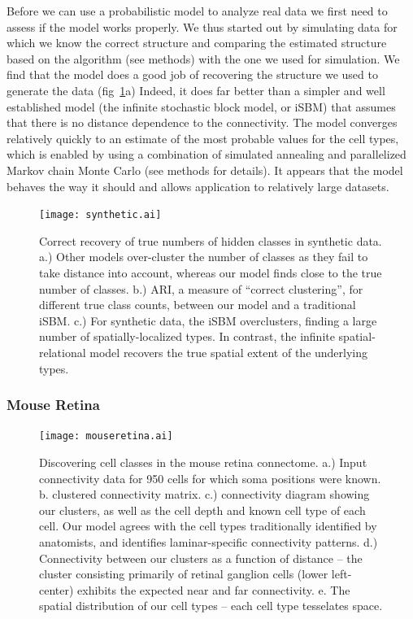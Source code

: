 \documentclass{article}
\begin{document}
Before we can use a probabilistic model to analyze real data we first
need to assess if the model works properly. We thus started out by
simulating data for which we know the correct structure and comparing
the estimated structure based on the algorithm (see methods) with the
one we used for simulation. We find that the model does a good job of
recovering the structure we used to generate the data
(fig~\ref{fig:synthetic}a) Indeed, it does far better than a simpler
and well established model (the infinite stochastic block model, or
iSBM) that assumes that there is no distance dependence to the
connectivity. The model converges relatively quickly to an estimate of
the most probable values for the cell types, which is enabled by using
a combination of simulated annealing and parallelized Markov chain
Monte Carlo (see methods for details). It appears that the model
behaves the way it should and allows application to relatively large
datasets.

\begin{figure}
  \centering 
  \centerline{\texttt{[image: synthetic.ai]}}
  \caption{Correct recovery of true numbers of hidden classes
in synthetic data. a.) Other models over-cluster the number
of classes as they fail to take distance into account, whereas
our model finds close to the true number of classes. b.) ARI, a measure
of ``correct clustering'', for
different true class counts, between our model and a traditional
iSBM. c.) For synthetic data, 
the iSBM overclusters, finding a large number of spatially-localized types. 
In contrast, the infinite spatial-relational model recovers the true spatial
extent of the underlying types.}
\label{fig:synthetic}
\end{figure}

\subsubsection{Mouse Retina}

\begin{figure}
  \centering 
  \centerline{\texttt{[image: mouseretina.ai]}}
  \caption{Discovering cell classes in the mouse retina connectome. 
a.) Input connectivity data for 950 cells for which soma positions were known. b. clustered connectivity matrix. c.) connectivity diagram showing our clusters, as
well as the cell depth and known cell type of each cell. Our model agrees
with the cell types traditionally identified by anatomists, and identifies 
laminar-specific connectivity patterns. d.) Connectivity between our
clusters as a function of distance -- the cluster consisting primarily of
retinal ganglion cells (lower left-center) exhibits the expected near and
far connectivity. e. The spatial distribution of our cell types -- each cell type tesselates space.}
\label{fig:mouseretina}
\end{figure}
\end{document}
